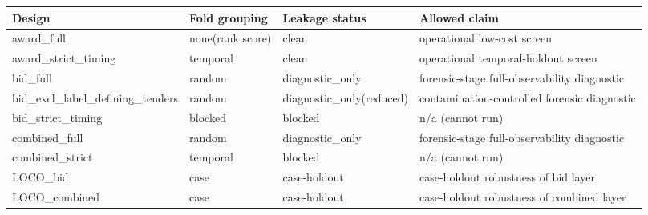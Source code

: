 \begin{tabular}{llll}
\toprule
Design & Fold grouping & Leakage status & Allowed claim \\
\midrule
award\_full & none(rank score) & clean & operational low-cost screen \\
award\_strict\_timing & temporal & clean & operational temporal-holdout screen \\
bid\_full & random & diagnostic\_only & forensic-stage full-observability diagnostic \\
bid\_excl\_label\_defining\_tenders & random & diagnostic\_only(reduced) & contamination-controlled forensic diagnostic \\
bid\_strict\_timing & blocked & blocked & n/a (cannot run) \\
combined\_full & random & diagnostic\_only & forensic-stage full-observability diagnostic \\
combined\_strict & temporal & blocked & n/a (cannot run) \\
LOCO\_bid & case & case-holdout & case-holdout robustness of bid layer \\
LOCO\_combined & case & case-holdout & case-holdout robustness of combined layer \\
\bottomrule
\end{tabular}
